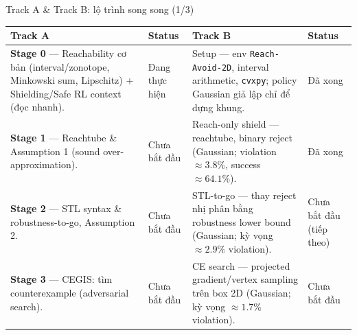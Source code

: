 \documentclass[aspectratio=169]{beamer}
\newcommand{\good}[1]{\textcolor{green!40!black}{#1}}
\begin{document}
\begin{frame}[t,shrink=8]{Track A \& Track B: lộ trình song song (1/3)}
\footnotesize
\begin{tabularx}{\textwidth}{|>{\raggedright\arraybackslash}p{}|>{\centering\arraybackslash}p{}|>{\raggedright\arraybackslash}p{}|>{\centering\arraybackslash}p{}|}
\hline
\textbf{Track A} & \textbf{Status} & \textbf{Track B} & \textbf{Status} \\
\hline
\textbf{Stage 0} --- Reachability cơ bản (interval/zonotope, Minkowski sum, Lipschitz) + Shielding/Safe RL context (đọc nhanh). &
Đang thực hiện &
Setup --- env \texttt{Reach-Avoid-2D}, interval arithmetic, \texttt{cvxpy}; policy Gaussian giả lập chỉ để dựng khung. &
\good{Đã xong} \\
\hline
\textbf{Stage 1} --- Reachtube \& Assumption 1 (sound over-approximation). &
Chưa bắt đầu &
Reach-only shield --- reachtube, binary reject (Gaussian; violation $\approx3.8\%$, success $\approx64.1\%$). &
\good{Đã xong} \\
\hline
\textbf{Stage 2} --- STL syntax \& robustness-to-go, Assumption 2. &
Chưa bắt đầu &
STL-to-go --- thay reject nhị phân bằng robustness lower bound (Gaussian; kỳ vọng $\approx2.9\%$ violation). &
Chưa bắt đầu (tiếp theo) \\
\hline
\textbf{Stage 3} --- CEGIS: tìm counterexample (adversarial search). &
Chưa bắt đầu &
CE search --- projected gradient/vertex sampling trên box 2D (Gaussian; kỳ vọng $\approx1.7\%$ violation). &
Chưa bắt đầu \\
\hline
\end{tabularx}
\end{frame}
\end{document}
